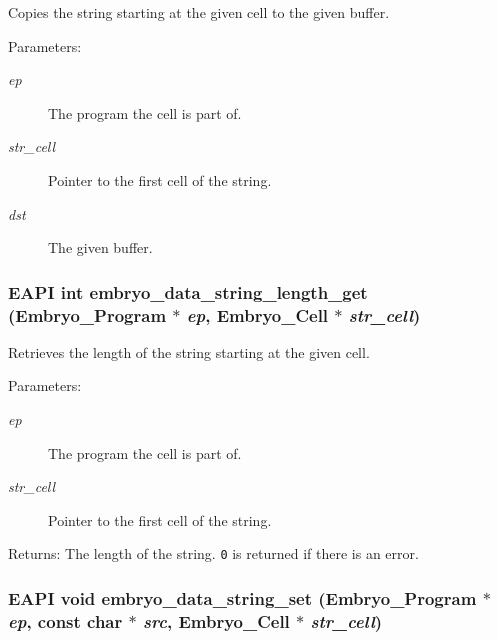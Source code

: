 Copies the string starting at the given cell to the given buffer. 

\begin{Desc}
\item[Parameters:]
\begin{description}
\item[{\em ep}]The program the cell is part of. \item[{\em str\_\-cell}]Pointer to the first cell of the string. \item[{\em dst}]The given buffer. \end{description}
\end{Desc}
\hypertarget{group__Embryo__Data__String__Group_g017e96ff1b5c2806c462ba08416a72d9}{
\subsubsection{\setlength{\rightskip}{0pt plus 5cm}EAPI int embryo\_\-data\_\-string\_\-length\_\-get (Embryo\_\-Program $\ast$ {\em ep}, \/  Embryo\_\-Cell $\ast$ {\em str\_\-cell})}}
\label{group__Embryo__Data__String__Group_g017e96ff1b5c2806c462ba08416a72d9}


Retrieves the length of the string starting at the given cell. 

\begin{Desc}
\item[Parameters:]
\begin{description}
\item[{\em ep}]The program the cell is part of. \item[{\em str\_\-cell}]Pointer to the first cell of the string. \end{description}
\end{Desc}
\begin{Desc}
\item[Returns:]The length of the string. {\tt 0} is returned if there is an error. \end{Desc}
\hypertarget{group__Embryo__Data__String__Group_g2f1b7e5ce221aaada5663e46f2578815}{
\subsubsection{\setlength{\rightskip}{0pt plus 5cm}EAPI void embryo\_\-data\_\-string\_\-set (Embryo\_\-Program $\ast$ {\em ep}, \/  const char $\ast$ {\em src}, \/  Embryo\_\-Cell $\ast$ {\em str\_\-cell})}}
\label{group__Embryo__Data__String__Group_g2f1b7e5ce221aaada5663e46f2578815}


